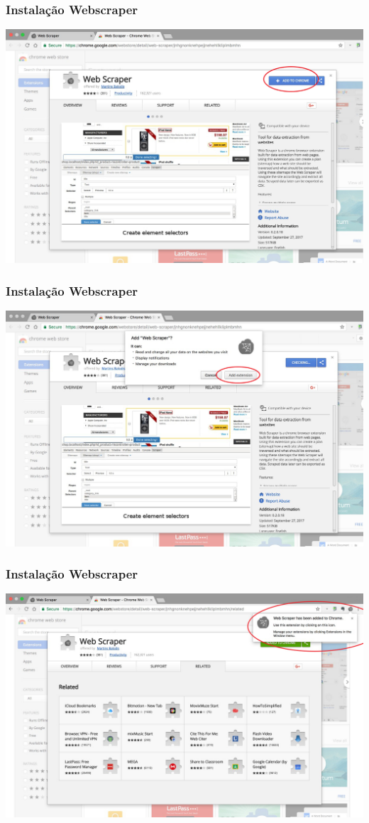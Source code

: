 \documentclass{beamer}
\begin{document}
\begin{frame}
\frametitle{Instalação Webscraper}
\includegraphics[width=\textwidth]{WhatsApp_Image_2017-10-05_at_17_22_44.jpg}
\end{frame}

\begin{frame}
\frametitle{Instalação Webscraper}
\includegraphics[width=\textwidth]{WhatsApp_Image_2017-10-05_at_17_22_44__1_.jpg}
\end{frame}

\begin{frame}
\frametitle{Instalação Webscraper}
\includegraphics[width=\textwidth]{WhatsApp_Image_2017-10-05_at_17_22_44__2_.jpg}
\end{frame}
\end{document}
